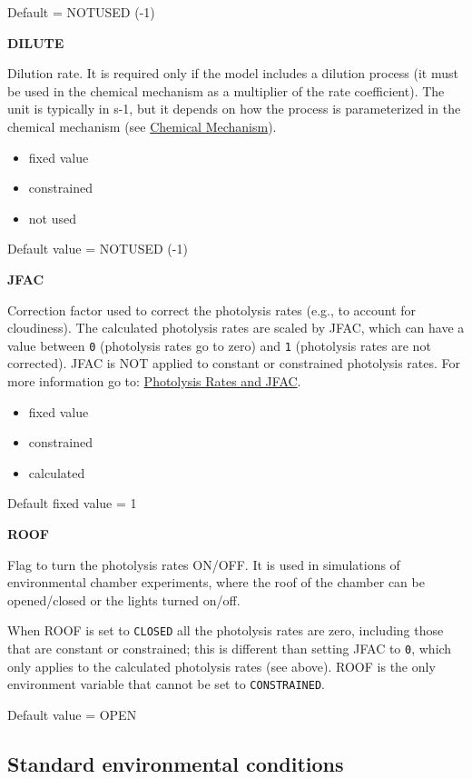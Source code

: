 Default = NOTUSED (-1)

\textbf{DILUTE}

Dilution rate. It is required only if the model includes a dilution
process (it must be used in the chemical mechanism as a multiplier of
the rate coefficient). The unit is typically in s-1, but it depends on
how the process is parameterized in the chemical mechanism (see
\hyperref[sec:mechanism]{Chemical Mechanism}).

\begin{itemize}
\item fixed value
\item constrained
\item not used
\end{itemize}

Default value = NOTUSED (-1)

\textbf{JFAC}

Correction factor used to correct the photolysis rates (e.g., to
account for cloudiness). The calculated photolysis rates are scaled by
JFAC, which can have a value between \texttt{0} (photolysis rates go
to zero) and \texttt{1} (photolysis rates are not corrected). JFAC is
NOT applied to constant or constrained photolysis rates. For more
information go to: \hyperref[sec:photolysis]{Photolysis Rates and
  JFAC}.

\begin{itemize}
\item fixed value
\item constrained
\item calculated
\end{itemize}

Default fixed value = 1

\textbf{ROOF}

Flag to turn the photolysis rates ON/OFF. It is used in simulations of
environmental chamber experiments, where the roof of the chamber can
be opened/closed or the lights turned on/off.

When ROOF is set to \texttt{CLOSED} all the photolysis rates are zero,
including those that are constant or constrained; this is different
than setting JFAC to \texttt{0}, which only applies to the calculated
photolysis rates (see above). ROOF is the only environment variable
that cannot be set to \texttt{CONSTRAINED}.

Default value = OPEN

\subsection{Standard environmental conditions} \label{subsec:standard-environmental-conditions}

